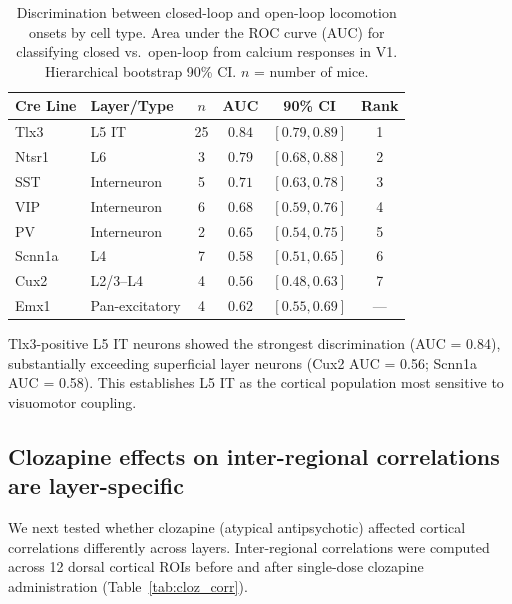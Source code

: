 \documentclass[11pt]{article}
\begin{document}
\begin{table}[H]
\centering
\caption{Discrimination between closed-loop and open-loop locomotion onsets by cell type. Area under the ROC curve (AUC) for classifying closed vs.\ open-loop from calcium responses in V1. Hierarchical bootstrap 90\% CI. $n$ = number of mice.}
\label{tab:cl_ol}
\begin{tabular}{llcccc}
\toprule
\textbf{Cre Line} & \textbf{Layer/Type} & \textbf{$n$} & \textbf{AUC} & \textbf{90\% CI} & \textbf{Rank} \\
\midrule
Tlx3 & L5 IT & 25 & $\mathbf{0.84}$ & $[0.79, 0.89]$ & 1 \\
Ntsr1 & L6 & 3 & $0.79$ & $[0.68, 0.88]$ & 2 \\
SST & Interneuron & 5 & $0.71$ & $[0.63, 0.78]$ & 3 \\
VIP & Interneuron & 6 & $0.68$ & $[0.59, 0.76]$ & 4 \\
PV & Interneuron & 2 & $0.65$ & $[0.54, 0.75]$ & 5 \\
Scnn1a & L4 & 7 & $0.58$ & $[0.51, 0.65]$ & 6 \\
Cux2 & L2/3--L4 & 4 & $0.56$ & $[0.48, 0.63]$ & 7 \\
Emx1 & Pan-excitatory & 4 & $0.62$ & $[0.55, 0.69]$ & --- \\
\bottomrule
\end{tabular}
\end{table}

Tlx3-positive L5 IT neurons showed the strongest discrimination (AUC = 0.84), substantially exceeding superficial layer neurons (Cux2 AUC = 0.56; Scnn1a AUC = 0.58). This establishes L5 IT as the cortical population most sensitive to visuomotor coupling.

\subsection{Clozapine effects on inter-regional correlations are layer-specific}

We next tested whether clozapine (atypical antipsychotic) affected cortical correlations differently across layers. Inter-regional correlations were computed across 12 dorsal cortical ROIs before and after single-dose clozapine administration (Table~\ref{tab:cloz_corr}).
\end{document}
